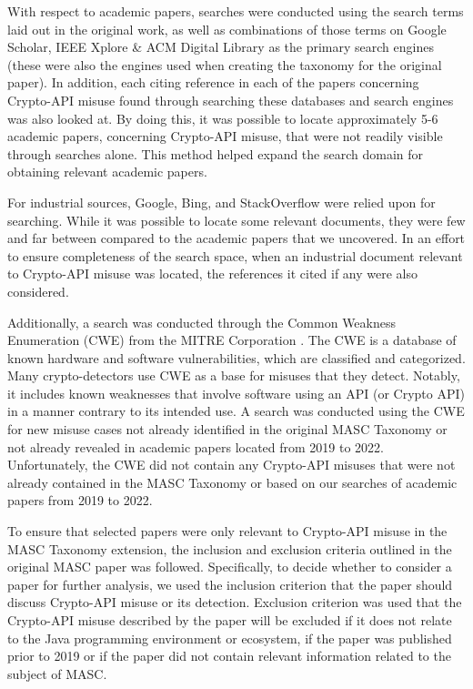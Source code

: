 With respect to academic papers, searches were conducted using the search terms laid out in the original work, as well as combinations of those terms on Google Scholar, IEEE Xplore \& ACM Digital Library as the primary search engines (these were also the engines used when creating the taxonomy for the original paper). In addition, each citing reference in each of the papers concerning Crypto-API misuse found through searching these databases and search engines was also looked at.  By doing this, it was possible to locate approximately 5-6 academic papers, concerning Crypto-API misuse, that were not readily visible through searches alone. This method helped expand the search domain for obtaining relevant academic papers.

For industrial sources, Google, Bing, and StackOverflow were relied upon for searching.  While it was possible to locate some relevant documents, they were few and far between compared to the academic papers that we uncovered.  In  an effort to ensure completeness of the search space,  when an industrial document relevant to Crypto-API misuse was located, the references it cited if any were also considered.

Additionally, a search was conducted through the Common Weakness Enumeration (CWE) from the MITRE Corporation \cite{MITRE}.  The CWE is a database of known hardware and software vulnerabilities, which are classified and categorized. Many crypto-detectors use CWE as a base for misuses that they detect.  Notably, it includes known weaknesses that involve software using an API (or Crypto API) in a manner contrary to its intended use.  A search was conducted using the CWE for new misuse cases not already identified in the original MASC Taxonomy or not already revealed in academic papers located from 2019 to 2022.  Unfortunately, the CWE did not contain any Crypto-API misuses that were not already contained in the MASC Taxonomy or based on our searches of academic papers from 2019 to 2022. 

To ensure that selected papers were only relevant to Crypto-API misuse in the MASC Taxonomy extension, the inclusion and exclusion criteria outlined in the original MASC paper was followed.  Specifically, to decide whether to consider a paper for further analysis, we used the inclusion criterion that the paper should discuss Crypto-API misuse or its detection. Exclusion criterion was used that the Crypto-API misuse described by the paper will be excluded if it does not relate to the Java programming environment or ecosystem, if the paper was published prior to 2019 or if the paper did not contain relevant information related to the subject of MASC.
    
